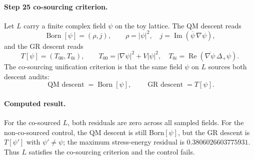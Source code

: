 \paragraph{Step 25 co-sourcing criterion.}
Let \(L\) carry a finite complex field \(\psi\) on the toy lattice.
The QM descent reads
\[
  \operatorname{Born}[\psi]=(\rho,j),
  \qquad
  \rho=|\psi|^2,\quad
  j=\operatorname{Im}(\overline\psi\,\nabla\psi),
\]
and the GR descent reads
\[
  T[\psi]=(T_{00},T_{0i}),
  \qquad
  T_{00}=|\nabla\psi|^2+V|\psi|^2,\quad
  T_{0i}=\operatorname{Re}(\overline{\nabla\psi}\,\Delta_+\psi).
\]
The co-sourcing unification criterion is that the same field \(\psi\)
on \(L\) sources both descent audits:
\[
  \operatorname{QM\ descent}=\operatorname{Born}[\psi],
  \qquad
  \operatorname{GR\ descent}=T[\psi].
\]

\paragraph{Computed result.}
For the co-sourced \(L\), both residuals are zero across all sampled
fields.  For the non-co-sourced control, the QM descent is still
Born\([\psi]\), but the GR descent is \(T[\psi']\) with
\(\psi'\ne\psi\); the maximum stress-energy residual is
\(0.3806026603775931\).  Thus \(L\) satisfies the co-sourcing
criterion and the control fails.
